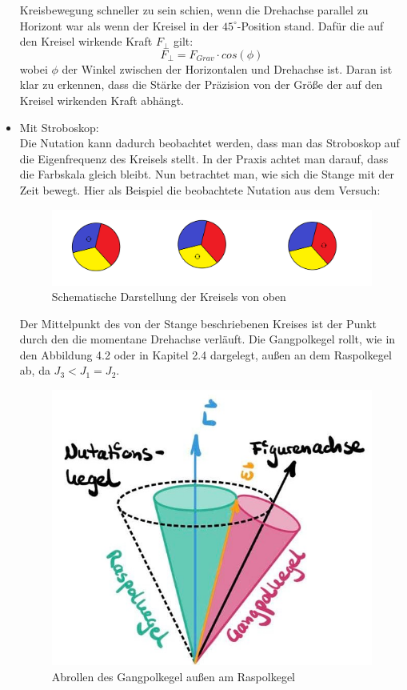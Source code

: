 \begin{itemize}
        Kreisbewegung schneller zu sein schien, wenn die Drehachse parallel zu Horizont war als wenn der Kreisel in der $45^\circ$-Position stand. Dafür die auf den 
        Kreisel wirkende Kraft $F_{\bot}$ gilt:
    \begin{equation*}
        F_{\bot} = F_{Grav} \cdot cos(\phi)
    \end{equation*}
    wobei $\phi$ der Winkel zwischen der Horizontalen und Drehachse ist.
    Daran ist klar zu erkennen, dass die Stärke der Präzision von der Größe der auf den Kreisel wirkenden Kraft abhängt.
    \item Mit Stroboskop:\\
        Die Nutation kann dadurch beobachtet werden, dass man das Stroboskop auf die Eigenfrequenz des Kreisels stellt. In der Praxis achtet man darauf, dass die Farbskala gleich bleibt. Nun betrachtet man, wie sich 
        die Stange mit der Zeit bewegt. Hier als Beispiel die beobachtete Nutation aus dem Versuch:\\
        \begin{figure}[h]
            \centering
            \includegraphics[width = 13cm]{Bilder/Leo/Nutationfarben.png}
            \caption{Schematische Darstellung der Kreisels von oben}
        \end{figure}
        Der Mittelpunkt des von der Stange beschriebenen Kreises ist der Punkt durch den die momentane Drehachse verläuft.
        Die Gangpolkegel rollt, wie in den Abbildung 4.2 oder in Kapitel 2.4
        dargelegt, außen an dem Raspolkegel ab, da $J_3 < J_1 = J_2$.
        \begin{figure}[h]
            \centering
            \includegraphics[scale = 0.3]{Bilder/6_1-Nutationsbewegung.jpg}
            \caption{Abrollen des Gangpolkegel außen am Raspolkegel}
        \end{figure}

\end{itemize}
\newpage